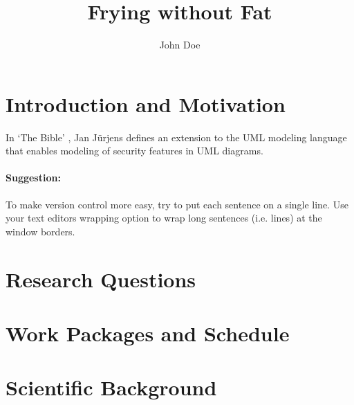 \documentclass[master,proposal,extern,palatino]{rgseThesis}
\author{John Doe}
\title{Frying without Fat}
\begin{document}

    \maketitle

    \tableofcontents


    \section{Introduction and Motivation}

    In `The Bible' \cite{Juerjens2005SSD}, Jan Jürjens defines an extension to the UML modeling language that enables modeling of security features in UML diagrams.

    \paragraph{Suggestion:}
    To make version control more easy, try to put each sentence on a single line.
    Use your text editors wrapping option to wrap long sentences (i.e. lines) at the window borders.

    \section{Research Questions}

    \lipsum[1-2]

    \section{Work Packages and Schedule}

    \lipsum[3-4]

    \section{Scientific Background}

    \lipsum[5]

    \printbibliography[heading=bibintoc]
\end{document}
